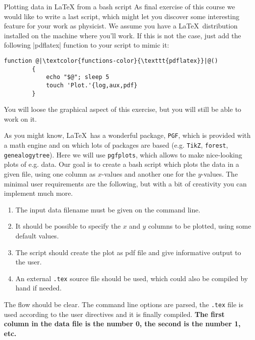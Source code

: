 
\begin{exercise}[Inspirational]{Plotting data in LaTeX from a bash script}
    As final exercise of this course we would like to write a last script, which might let you discover some interesting feature for your work as physicist.
    We assume you have a \LaTeX\ distribution installed on the machine where you'll work.
    If this is not the case, just add the following \bash|pdflatex| function to your script to mimic it:
    \begin{lstlisting}[style=myBash]
        function @|\textcolor{functions-color}{\texttt{pdflatex}}|@()
        {
            echo "$@"; sleep 5
            touch 'Plot.'{log,aux,pdf}
        }
    \end{lstlisting}
    You will loose the graphical aspect of this exercise, but you will still be able to work on it.

    As you might know, \LaTeX\ has a wonderful package, \texttt{PGF}, which is provided with a math engine and on which lots of packages are based (e.g. \texttt{TikZ}, \texttt{forest}, \texttt{genealogytree}).
    Here we will use \texttt{pgfplots}, which allows to make nice-looking plots of e.g. data.
    Our goal is to create a bash script which plots the data in a given file, using one column as $x$-values and another one for the $y$-values.
    The minimal user requirements are the following, but with a bit of creativity you can implement much more.
    \begin{enumerate}
        \item The input data filename must be given on the command line.
        \item It should be possible to specify the $x$ and $y$ columns to be plotted, using some default values.
        \item The script should create the plot as pdf file and give informative output to the user.
        \item An external \texttt{.tex} source file should be used, which could also be compiled by hand if needed.
    \end{enumerate}

    The flow should be clear.
    The command line options are parsed, the \texttt{.tex} file is used according to the user directives and it is finally compiled.
    \textbf{The first column in the data file is the number 0, the second is the number 1, etc.}


\end{exercise}
